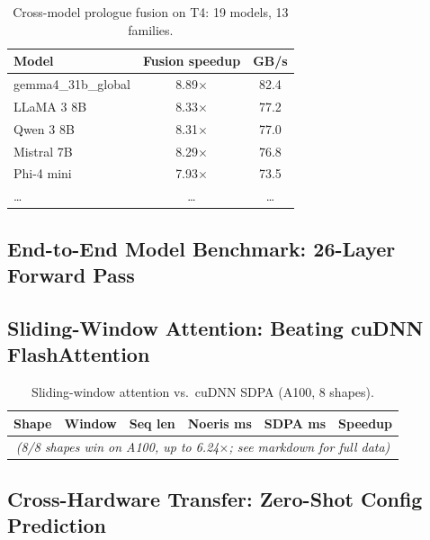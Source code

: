 \documentclass{article}
\begin{document}
\begin{table}[t]
\centering
\caption{Cross-model prologue fusion on T4: 19 models, 13 families.}
\label{tab:cross-model-t4}
\small
\begin{tabular}{@{}lcc@{}}
\toprule
Model & Fusion speedup & GB/s \\
\midrule
gemma4\_31b\_global & 8.89$\times$ & 82.4 \\
LLaMA 3 8B & 8.33$\times$ & 77.2 \\
Qwen 3 8B & 8.31$\times$ & 77.0 \\
Mistral 7B & 8.29$\times$ & 76.8 \\
Phi-4 mini & 7.93$\times$ & 73.5 \\
\ldots & \ldots & \ldots \\
\bottomrule
\end{tabular}
\end{table}

\subsection{End-to-End Model Benchmark: 26-Layer Forward Pass}
\label{sec:e2e}

\subsection{Sliding-Window Attention: Beating cuDNN FlashAttention}
\label{sec:swa-eval}

\begin{table}[t]
\centering
\caption{Sliding-window attention vs.\ cuDNN SDPA (A100, 8 shapes).}
\label{tab:swa}
\small
\begin{tabular}{@{}lccccc@{}}
\toprule
Shape & Window & Seq len & Noeris ms & SDPA ms & Speedup \\
\midrule
\multicolumn{6}{c}{\emph{(8/8 shapes win on A100, up to 6.24$\times$; see markdown for full data)}} \\
\bottomrule
\end{tabular}
\end{table}

\subsection{Cross-Hardware Transfer: Zero-Shot Config Prediction}
\label{sec:cross-hw-transfer}
\end{document}
